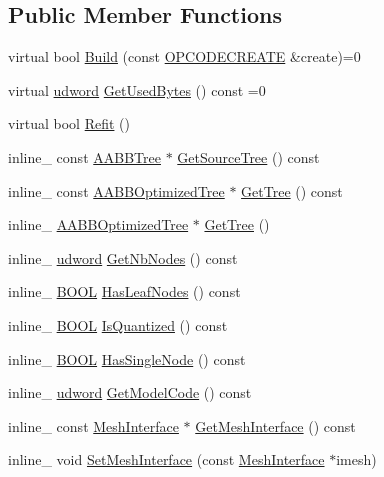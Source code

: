 \subsection*{Public Member Functions}
\begin{DoxyCompactItemize}
\item 
virtual bool \hyperlink{classBaseModel_ab2692ac2ec9c0c8c452d73f3a0bd341b}{Build} (const \hyperlink{structOPCODECREATE}{O\+P\+C\+O\+D\+E\+C\+R\+E\+A\+TE} \&create)=0
\item 
virtual \hyperlink{IceTypes_8h_a44c6f1920ba5551225fb534f9d1a1733}{udword} \hyperlink{classBaseModel_a714251e9cd861e4e304f5740c75a5b74}{Get\+Used\+Bytes} () const =0
\item 
virtual bool \hyperlink{classBaseModel_a5776072914754d8ba95856d27ce24a6d}{Refit} ()
\item 
inline\+\_\+ const \hyperlink{classAABBTree}{A\+A\+B\+B\+Tree} $\ast$ \hyperlink{classBaseModel_a9a72077f4535987b8bcca9d8fd4322ff}{Get\+Source\+Tree} () const 
\item 
inline\+\_\+ const \hyperlink{classAABBOptimizedTree}{A\+A\+B\+B\+Optimized\+Tree} $\ast$ \hyperlink{classBaseModel_abc95fd0dde58d8c9468f6772c1e085f2}{Get\+Tree} () const 
\item 
inline\+\_\+ \hyperlink{classAABBOptimizedTree}{A\+A\+B\+B\+Optimized\+Tree} $\ast$ \hyperlink{classBaseModel_ac278bb341163cec3d71026f4e7f7f29e}{Get\+Tree} ()
\item 
inline\+\_\+ \hyperlink{IceTypes_8h_a44c6f1920ba5551225fb534f9d1a1733}{udword} \hyperlink{classBaseModel_a511257faf2505c41f70c41ddee13a22d}{Get\+Nb\+Nodes} () const 
\item 
inline\+\_\+ \hyperlink{IceTypes_8h_a050c65e107f0c828f856a231f4b4e788}{B\+O\+OL} \hyperlink{classBaseModel_a6e6e9719dd522561c1473997db74c260}{Has\+Leaf\+Nodes} () const 
\item 
inline\+\_\+ \hyperlink{IceTypes_8h_a050c65e107f0c828f856a231f4b4e788}{B\+O\+OL} \hyperlink{classBaseModel_a8403c6e8982a6aec5d10615391e5c74f}{Is\+Quantized} () const 
\item 
inline\+\_\+ \hyperlink{IceTypes_8h_a050c65e107f0c828f856a231f4b4e788}{B\+O\+OL} \hyperlink{classBaseModel_a2bd8daf07f806dd18d248547295673ce}{Has\+Single\+Node} () const 
\item 
inline\+\_\+ \hyperlink{IceTypes_8h_a44c6f1920ba5551225fb534f9d1a1733}{udword} \hyperlink{classBaseModel_a70e5ef1ac02803b27ab5ac24ee8fea2f}{Get\+Model\+Code} () const 
\item 
inline\+\_\+ const \hyperlink{classMeshInterface}{Mesh\+Interface} $\ast$ \hyperlink{classBaseModel_a0fb2f7fb04cfa2187e1168d328736c48}{Get\+Mesh\+Interface} () const 
\item 
inline\+\_\+ void \hyperlink{classBaseModel_a3ee9dff2e45def7842c8a96133b62c3c}{Set\+Mesh\+Interface} (const \hyperlink{classMeshInterface}{Mesh\+Interface} $\ast$imesh)
\end{DoxyCompactItemize}
